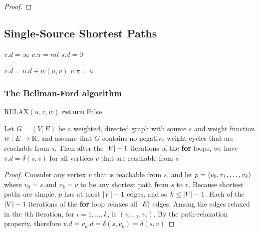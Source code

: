 \documentclass[11pt]{article}
\begin{document}
\begin{proof}

\end{proof}
\subsection{Single-Source Shortest Paths}
\label{sec:org73f43f2}
\begin{algorithmic}[1]
    \State \(v.d=\infty\)
    \State \(v.\pi=nil\)
\EndFor
\State \(s.d=0\)
\EndProcedure
\end{algorithmic}

\begin{algorithmic}[1]
    \State \(v.d=u.d+w(u,v)\)
    \State \(v.\pi=u\)
\EndIf
\EndProcedure
\end{algorithmic}

\subsubsection{The Bellman-Ford algorithm}
\label{sec:orgd1cc063}
\begin{algorithmic}[1]
            \State RELAX\((u,v,w)\)
        \EndFor
    \EndFor
            \State \textbf{return }False
        \EndIf
    \EndFor
\EndProcedure
\end{algorithmic}


\begin{lemma}[]
Let \(G=(V,E)\) be a weighted, directed graph with source \(s\) and weight function \(w:E\to\mathbb{R}\),
and assume that \(G\) contains no negative-weight cycles that are reachable from \(s\). Then
after the \(\abs{V}-1\) iterations of the \textbf{for} loops, we have \(v.d=\delta(s,v)\) for all
vertices \(v\) that are reachable from \(s\)
\end{lemma}

\begin{proof}
Consider any vertex \(v\) that is reachable from \(s\), and let \(p=\langle v_0,v_1,\dots,v_k\rangle\)
where \(v_0=s\) and \(v_k=v\) to be any shortest path from \(s\) to \(v\). Because shortest
paths are simple, \(p\) has at most \(\abs{V}-1\) edges, and so \(k\le\abs{V}-1\). Each of
the \(\abs{V}-1\) iterations of the \textbf{for} loop relaxes all \(\abs{E}\) edges. Among the edges
relaxed in the \(i\)th iteration, for \(i=1,\dots,k\), is \((v_{i-1},v_i)\). By the path-relaxation
property, therefore \(v.d=v_k.d=\delta(s,v_k)=\delta(s,v)\)
\end{proof}
\end{document}
